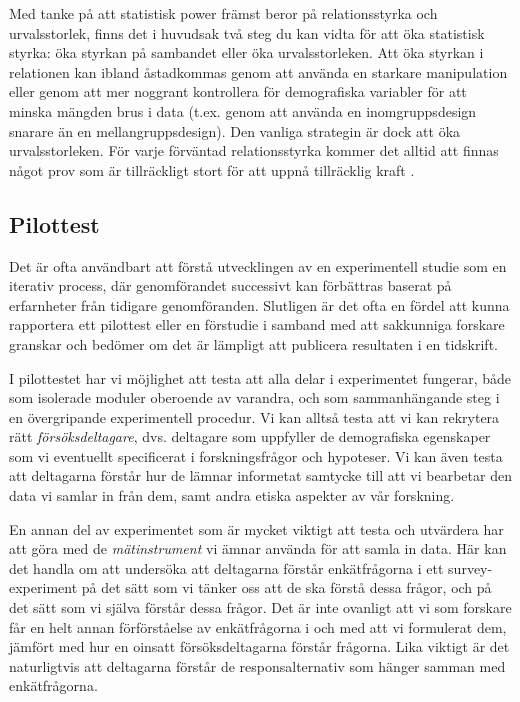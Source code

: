 \documentclass[
]{book}
\begin{document}
Med tanke på att statistisk power främst beror på relationsstyrka och urvalsstorlek, finns det i huvudsak två steg du kan vidta för att öka statistisk styrka: öka styrkan på sambandet eller öka urvalsstorleken. Att öka styrkan i relationen kan ibland åstadkommas genom att använda en starkare manipulation eller genom att mer noggrant kontrollera för demografiska variabler för att minska mängden brus i data (t.ex. genom att använda en inomgruppsdesign snarare än en mellangruppsdesign). Den vanliga strategin är dock att öka urvalsstorleken. För varje förväntad relationsstyrka kommer det alltid att finnas något prov som är tillräckligt stort för att uppnå tillräcklig kraft \citep{faul2007g, faul2009statistical}.

\hypertarget{sub07.1.2}{%
\subsection{Pilottest}\label{sub07.1.2}}

Det är ofta användbart att förstå utvecklingen av en experimentell studie som en iterativ process, där genomförandet successivt kan förbättras baserat på erfarnheter från tidigare genomföranden. Slutligen är det ofta en fördel att kunna rapportera ett pilottest eller en förstudie i samband med att sakkunniga forskare granskar och bedömer om det är lämpligt att publicera resultaten i en tidskrift.

I pilottestet har vi möjlighet att testa att alla delar i experimentet fungerar, både som isolerade moduler oberoende av varandra, och som sammanhängande steg i en övergripande experimentell procedur. Vi kan alltså testa att vi kan rekrytera rätt \emph{försöksdeltagare}, dvs. deltagare som uppfyller de demografiska egenskaper som vi eventuellt specificerat i forskningsfrågor och hypoteser. Vi kan även testa att deltagarna förstår hur de lämnar informetat samtycke till att vi bearbetar den data vi samlar in från dem, samt andra etiska aspekter av vår forskning.

En annan del av experimentet som är mycket viktigt att testa och utvärdera har att göra med de \emph{mätinstrument} vi ämnar använda för att samla in data. Här kan det handla om att undersöka att deltagarna förstår enkätfrågorna i ett survey-experiment på det sätt som vi tänker oss att de ska förstå dessa frågor, och på det sätt som vi själva förstår dessa frågor. Det är inte ovanligt att vi som forskare får en helt annan förförståelse av enkätfrågorna i och med att vi formulerat dem, jämfört med hur en oinsatt försöksdeltagarna förstår frågorna. Lika viktigt är det naturligtvis att deltagarna förstår de responsalternativ som hänger samman med enkätfrågorna.
\end{document}
